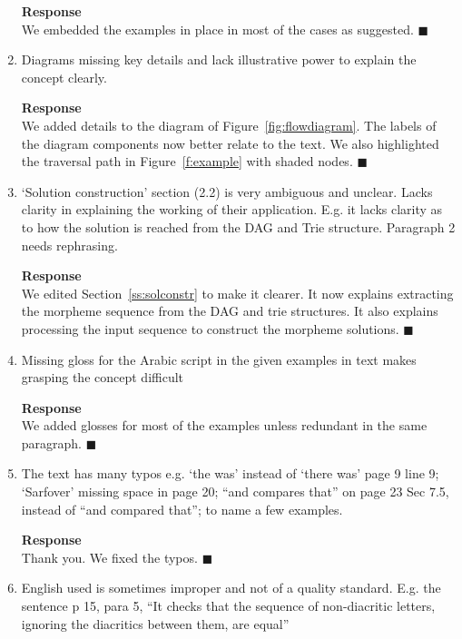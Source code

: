 \begin{enumerate}[leftmargin=0mm,label=\bfseries CommentR2.\arabic*]
\textbf{Response}\\
We embedded the examples in place in most of the cases as suggested. 
$\blacksquare$

\item \label{Review.2.10}
Diagrams missing key details and lack illustrative power to explain the
concept clearly.

\textbf{Response}\\
We added details to the diagram of Figure~\ref{fig:flowdiagram}. The labels of the diagram components now
better relate to the text. 
We also highlighted the traversal path in Figure~\ref{f:example} with shaded nodes. 
$\blacksquare$

\item \label{Review.2.11}
`Solution construction' section (2.2) is very ambiguous and unclear. Lacks
clarity in explaining the working of their application. E.g. it lacks clarity as to
how the solution is reached from the DAG and Trie structure. Paragraph 2
needs rephrasing.

\textbf{Response}\\
We edited Section~\ref{ss:solconstr} to make it clearer. 
It now explains extracting the morpheme sequence from the DAG and trie structures. 
It also explains processing the input sequence to construct the morpheme solutions. 
$\blacksquare$

\item \label{Review.2.12}
Missing gloss for the Arabic script in the given examples in text makes
grasping the concept difficult

\textbf{Response}\\
We added glosses for most of the examples unless redundant in the same paragraph. 
$\blacksquare$

\item \label{Review.2.13}
The text has many typos e.g. `the was' instead of `there was' page 9 line 9;
`Sarfover' missing space in page 20; ``and compares that'' on page 23 Sec 7.5,
instead of ``and compared that''; to name a few examples.

\textbf{Response}\\
Thank you. We fixed the typos.
$\blacksquare$

\item \label{Review.2.14}
English used is sometimes improper and not of a quality standard. E.g. the
sentence p 15, para 5, ``It checks that the sequence of non-diacritic letters,
ignoring the diacritics between them, are equal''


\end{enumerate}
